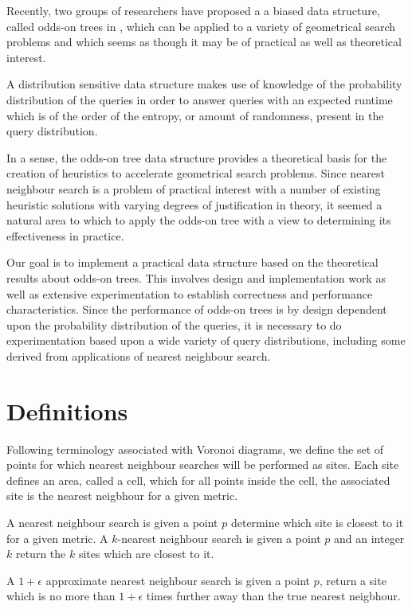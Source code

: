 \documentclass[mcs]{scsthesis}
\begin{document}
Recently, two groups of researchers \cite{chan} \cite{oddson} have proposed a
a biased data structure, called odds-on trees in \cite{oddson},  which can be
applied to a variety of geometrical search problems and which seems as though it
may be of practical as well as theoretical interest.

A distribution sensitive data structure makes use of knowledge of the
probability distribution of the queries in order to answer queries with an
expected runtime which is of the order of the entropy, or amount of randomness,
present in the query distribution. 

In a sense, the odds-on tree data structure provides a theoretical basis for
the creation of heuristics to accelerate geometrical search problems. Since
nearest neighbour search is a problem of practical interest with a number of
existing heuristic solutions with varying degrees of justification in theory,
it seemed a natural area to which to apply the odds-on tree with a view to
determining its effectiveness in practice.

Our goal is to implement a practical data structure based on the theoretical
results about odds-on trees.  This involves design and implementation work as
well as extensive experimentation to establish correctness and performance
characteristics.  Since the performance of odds-on trees is by design
dependent upon the probability distribution of the queries, it is necessary
to do experimentation based upon a wide variety of query distributions,
including some derived from applications of nearest neighbour search.

\section{Definitions}

Following terminology associated with Voronoi diagrams, we define the set of
points for which nearest neighbour searches will be performed as sites. Each
site defines an area, called a cell, which for all points inside the cell, the
associated site is the nearest neigbhour for a given metric.

A nearest neighbour search is given a point \(p\) determine which site is
closest to it for a given metric. A \(k\)-nearest neighbour search is given a
point \(p\) and an integer \(k\) return the \(k\) sites which are closest to it. 

A \(1 + \epsilon\) approximate nearest neighbour search is given a point \(p\),
return a site which is no more than \(1 + \epsilon\) times further away than
the true nearest neigbhour.
\end{document}
